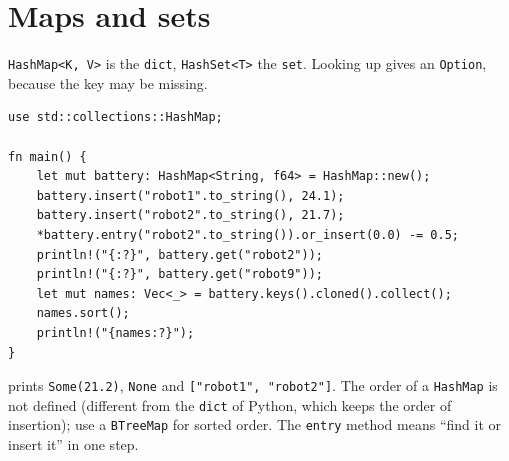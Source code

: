 \section*{Maps and sets}
\verb!HashMap<K, V>! is the \verb!dict!, \verb!HashSet<T>! the \verb!set!. Looking up gives an \verb!Option!, because the key may be missing.
\begin{verbatim}
use std::collections::HashMap;

fn main() {
    let mut battery: HashMap<String, f64> = HashMap::new();
    battery.insert("robot1".to_string(), 24.1);
    battery.insert("robot2".to_string(), 21.7);
    *battery.entry("robot2".to_string()).or_insert(0.0) -= 0.5;
    println!("{:?}", battery.get("robot2"));
    println!("{:?}", battery.get("robot9"));
    let mut names: Vec<_> = battery.keys().cloned().collect();
    names.sort();
    println!("{names:?}");
}
\end{verbatim}
prints \verb!Some(21.2)!, \verb!None! and \verb!["robot1", "robot2"]!. The order of a \verb!HashMap! is not defined (different from the \verb!dict! of Python, which keeps the order of insertion); use a \verb!BTreeMap! for sorted order. The \verb!entry! method means ``find it or insert it'' in one step.

